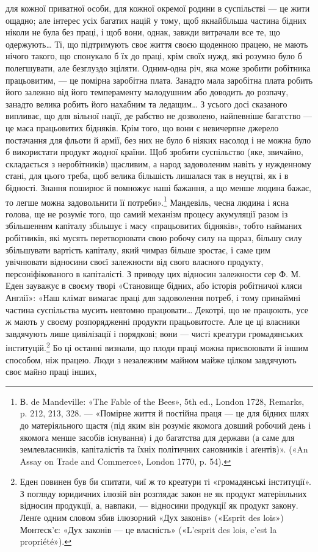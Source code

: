 \parcont{}  %
для кожної приватної особи, для кожної окремої родини в суспільстві
— це жити ощадно; але інтерес усіх багатих націй у
тому, щоб якнайбільша частина бідних ніколи не була без праці,
і щоб вони, однак, завжди витрачали все те, що одержують\dots{}
Ті, що підтримують своє життя своєю щоденною працею, не
мають нічого такого, що спонукало б їх до праці, крім своїх
нужд, які розумно було б полегшувати, але безглуздо зціляти.
Одним-одна річ, яка може зробити робітника працьовитим, —
це помірна заробітна плата. Занадто мала заробітна плата робить
його залежно від його темпераменту малодушним або доводить
до розпачу, занадто велика робить його нахабним та ледащим\dots{}
З усього досі сказаного випливає, що для вільної нації, де рабство
не дозволено, найпевніше багатство — це маса працьовитих бідняків.
Крім того, що вони є невичерпне джерело постачання для
фльоти й армії, без них не було б ніяких насолод і не можна
було б використати продукт жодної країни. Щоб зробити суспільство
(яке, звичайно, складається з неробітників) щасливим, а
народ задоволеним навіть у нужденному стані, для цього треба,
щоб велика більшість лишалася так в неуцтві, як і в бідності.
Знання поширює й помножує наші бажання, а що менше людина
бажає, то легше можна задовольнити її потреби».\footnote{
В. de Mandeville: «The Fable of the Bees», 5th ed., London 1728,
Remarks, p. 212, 213, 328. — «Помірне життя й постійна праця — це для
бідних шлях до матеріяльного щастя (під яким він розуміє якомога довший
робочий день і якомога менше засобів існування) і до багатства для
держави (а саме для землевласників, капіталістів та їхніх політичних
сановників і аґентів)». («An Assay on Trade and Commerce», London
1770, p. 54).
} Мандевіль,
чесна людина і ясна голова, ще не розуміє того, що самий механізм
процесу акумуляції разом із збільшенням капіталу збільшує
і масу «працьовитих бідняків», тобто найманих робітників,
які мусять перетворювати свою робочу силу на щораз, більшу
силу збільшувати вартість капіталу, який чимраз більше зростає,
і саме цим увічнювати відносини своєї залежности від
свого власного продукту, персоніфікованого в капіталісті. З приводу
цих відносин залежности сер Ф. М. Еден зауважує в своєму
творі «Становище бідних, або історія робітничої кляси Англії»:
«Наш клімат вимагає праці для задоволення потреб, і тому
принаймні частина суспільства мусить невтомно працювати\dots{}
Декотрі, що не працюють, усе ж мають у своєму розпорядженні
продукти працьовитосте. Але це ці власники завдячують лише
цивілізації і порядкові; вони — чисті креатури громадянських
інституцій.\footnote{
Еден повинен був би спитати, чиї ж то креатури ті «громадянські
інституції». З погляду юридичних ілюзій він розглядає закон не як
продукт матеріяльних відносин продукції, а, навпаки, — відносини продукції
як продукт закону. Ленґе одним словом збив ілюзорний «Дух
законів» («Esprit des lois») Монтеск’є: «Дух законів — це власність»
(«L’esprit des lois, c’est la propriété»).
} Бо ці останні визнали, що плоди праці можна
присвоювати й іншим способом, ніж працею. Люди з незалежним
майном майже цілком завдячують своє майно праці інших,
\parbreak{}  %
